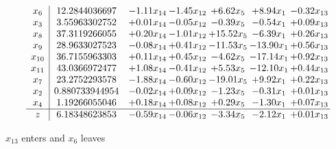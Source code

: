 \documentclass[9pt]{article}
\begin{document}
 \[\begin{array}{c| c c@{\hskip 2pt} c@{\hskip 2pt} c@{\hskip 2pt} c@{\hskip 2pt} c@{\hskip 2pt} }
 x_{6}   &  12.2844036697 & -1.11 x_{14} & -1.45 x_{12} & +  6.62 x_{5} & +  8.94 x_{1} & -0.32 x_{13}\\
 x_{3}   &  3.55963302752 & +  0.01 x_{14} & -0.05 x_{12} & -0.39 x_{5} & -0.54 x_{1} & +  0.09 x_{13}\\
 x_{8}   &  37.3119266055 & +  0.20 x_{14} & -1.01 x_{12} & + 15.52 x_{5} & -6.39 x_{1} & +  0.26 x_{13}\\
 x_{9}   &  28.9633027523 & -0.08 x_{14} & +  0.41 x_{12} & -11.53 x_{5} & -13.90 x_{1} & +  0.56 x_{13}\\
 x_{10}   &  36.7155963303 & +  0.11 x_{14} & +  0.45 x_{12} & -4.62 x_{5} & -17.14 x_{1} & +  0.92 x_{13}\\
 x_{11}   &  43.0366972477 & +  1.08 x_{14} & -0.41 x_{12} & +  5.53 x_{5} & -12.10 x_{1} & +  0.44 x_{13}\\
 x_{7}   &  23.2752293578 & -1.88 x_{14} & -0.60 x_{12} & -19.01 x_{5} & +  9.92 x_{1} & +  0.22 x_{13}\\
 x_{2}   &  0.880733944954 & -0.02 x_{14} & +  0.09 x_{12} & -1.23 x_{5} & -0.31 x_{1} & +  0.01 x_{13}\\
 x_{4}   &  1.19266055046 & +  0.18 x_{14} & +  0.08 x_{12} & +  0.29 x_{5} & -1.30 x_{1} & +  0.07 x_{13}\\
\hline
z    &  6.18348623853 & -0.59 x_{14} & -0.06 x_{12} & -3.34 x_{5} & -2.12 x_{1} & +  0.01 x_{13}\\
\end{array}\]


 $ x_{13} $ enters and $ x_{6} $ leaves 
\end{document}
